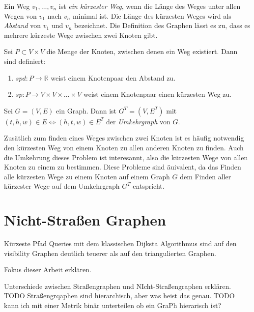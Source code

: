 \begin{definition}
    Ein Weg $v_1, \dotsc, v_n$ ist \emph{ein kürzester Weg}, wenn die Länge des Weges unter allen Wegen von $v_1$ nach $v_n$ minimal ist. Die Länge des kürzesten Weges wird als \emph{Abstand} von $v_1$ und $v_n$ bezeichnet. Die Definition des Graphen lässt es zu, dass es mehrere kürzeste Wege zwischen zwei Knoten gibt.

    Sei $P \subset V \times V$ die Menge der Knoten, zwischen denen ein Weg existiert. Dann sind definiert:
    \begin{enumerate}
        \item
              ${spd} \colon P \to \mathbb{R}$ weist einem Knotenpaar den Abstand zu.

        \item
              ${sp} \colon P \to V \times V \times \dots \times V$ weist einem Knotenpaar einen kürzesten Weg zu.
    \end{enumerate}
\end{definition}

\begin{definition}[Umkehrgraph]
    Sei $G = (V, E)$ ein Graph. Dann ist $G^T = (V, E^T)$ mit $(t, h, w) \in E \Leftrightarrow (h, t, w) \in E^T$ der \emph{Umkehrgraph} von $G$.
\end{definition}

Zusätlich zum finden eines Weges zwischen zwei Knoten ist es häufig notwendig den kürzesten Weg von einem Knoten zu allen anderen Knoten zu finden.
Auch die Umkehrung dieses Problem ist interesannt, also die kürzesten Wege von allen Knoten zu einem zu bestimmen.
Diese Probleme sind äuivalent, da das Finden alle kürzesten Wege zu einem Knoten auf einem Graph $G$ dem Finden aller kürzester Wege auf dem Umkehrgraph $G^T$ entspricht.

\section{Nicht-Straßen Graphen}



Kürzeste Pfad Queries mit dem klassischen Dijksta Algorithmus sind auf den visibility Graphen deutlich teuerer als auf den triangulierten Graphen.


Fokus dieser Arbeit erklären.

Unterschiede zwischen Straßengraphen und NIcht-Straßengraphen erklären.
TODO Straßengrqaphen sind hierarchisch, aber was heist das genau.
TODO kann ich mit einer Metrik binär unterteilen ob ein GraPh hierarisch ist?


